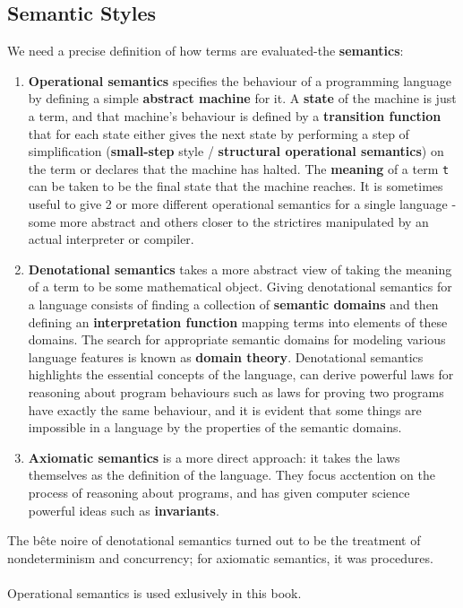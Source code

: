 \documentclass{article}
\begin{document}
\subsection{Semantic Styles}
We need a precise definition of how terms are evaluated-the \textbf{semantics}:
\begin{enumerate}
\item \textbf{Operational semantics} specifies the behaviour of a programming language by defining a simple \textbf{abstract machine} for it.
    A \textbf{state} of the machine is just a term, and that machine's behaviour is defined by a \textbf{transition function} that for each state either gives the next state by performing a step of simplification (\textbf{small-step} style / \textbf{structural operational semantics}) on the term 
    or declares that the machine has halted. The \textbf{meaning} of a term \texttt{t} can be taken to be the final state that the machine reaches.
    It is sometimes useful to give 2 or more different operational semantics for a single language - some more abstract and others closer to the strictires manipulated by an actual interpreter or compiler.
\item \textbf{Denotational semantics} takes a more abstract view of taking the meaning of a term to be some mathematical object. Giving denotational semantics for a language consists of finding a collection of \textbf{semantic domains} 
    and then defining an \textbf{interpretation function} mapping terms into elements of these domains. The search for appropriate semantic domains for modeling various language features is known as \textbf{domain theory}. 
    Denotational semantics highlights the essential concepts of the language, can derive powerful laws for reasoning about program behaviours such as laws for proving two programs have exactly the same behaviour, and it is evident that some things are impossible in a language 
    by the properties of the semantic domains.
\item \textbf{Axiomatic semantics} is a more direct approach: it takes the laws themselves as the definition of the language. They focus acctention on the process of reasoning about programs, and has given computer science powerful ideas such as \textbf{invariants}.
\end{enumerate}
The bête noire of denotational semantics turned out to be the treatment of nondeterminism
and concurrency; for axiomatic semantics, it was procedures.\\\\
Operational semantics is used exlusively in this book.
\end{document}

